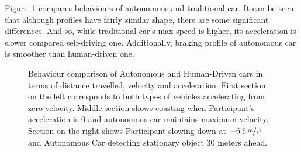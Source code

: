 \documentclass[11pt,english]{article}
\begin{document}
Figure~\ref{fig:super_graph} compares behaviours of autonomous and traditional car. It can be seen that although profiles have fairly similar shape, there are some significant differences. And so, while traditional car's max speed is higher, its acceleration is slower compared self-driving one. Additionally, braking profile of autonomous car is smoother than human-driven one.



\begin{figure}[!] %
\caption{Behaviour comparison of Autonomous and Human-Driven cars in terms of distance travelled, velocity and acceleration. First section on the left corresponds to both types of vehicles accelerating from zero velocity. Middle section shows coasting when Participant's acceleration is 0 and autonomous car maintains maximum velocity. Section on the right shows Participant slowing down at $-6.5\:\nicefrac{m}{s^2}$ and Autonomous Car detecting stationary object 30 meters ahead.}
\label{fig:super_graph}
\end{figure} 
\end{document}
